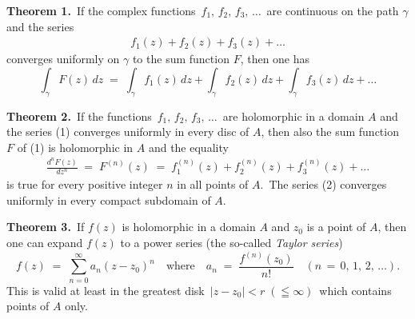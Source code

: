\documentclass[12pt]{article}
\theoremstyle{definition}
\begin{document}
\textbf{Theorem 1.}\, If the complex functions\, $f_1,\,f_2,\,f_3,\,\ldots$\, are continuous on the path $\gamma$ and the series 
\begin{align}
f_1(z)+f_2(z)+f_3(z)+\ldots
\end{align}
converges uniformly on $\gamma$ to the sum function $F$, then one has
$$\int_{\gamma}F(z)\,dz \;=\; \int_{\gamma}f_1(z)\,dz+\int_{\gamma}f_2(z)\,dz+\int_{\gamma}f_3(z)\,dz+\ldots$$

\textbf{Theorem 2.}\, If the functions\, $f_1,\,f_2,\,f_3,\,\ldots$\, are holomorphic in a domain $A$ and the series (1) converges uniformly in every  disc of $A$, then also the sum function $F$ of (1) is holomorphic in $A$ and the equality
\begin{align}
\frac{d^nF(z)}{dz^n} \;=\; F^{(n)}(z) \;=\; 
f_1^{(n)}(z)+f_2^{(n)}(z)+f_3^{(n)}(z)+\ldots
\end{align}
is true for every positive integer $n$ in all points of $A$.\, The series (2) converges uniformly in every compact subdomain of $A$.

\textbf{Theorem 3.}\, If $f(z)$ is holomorphic in a domain $A$ and $z_0$ is a point of $A$, then one can expand $f(z)$ to a power series (the so-called {\em Taylor series})
$$f(z) \;=\; \sum_{n=0}^\infty a_n(z\!-\!z_0)^n \quad \mathrm{where} 
\quad a_n \;=\; \frac{f^{(n)}(z_0)}{n!}\quad(n \,=\, 0,\,1,\,2,\,\ldots).$$
This  is valid at least in the greatest disk\, 
$|z-z_0| < r\; (\leqq \infty)$\, which contains points of $A$ only.

\end{document}
